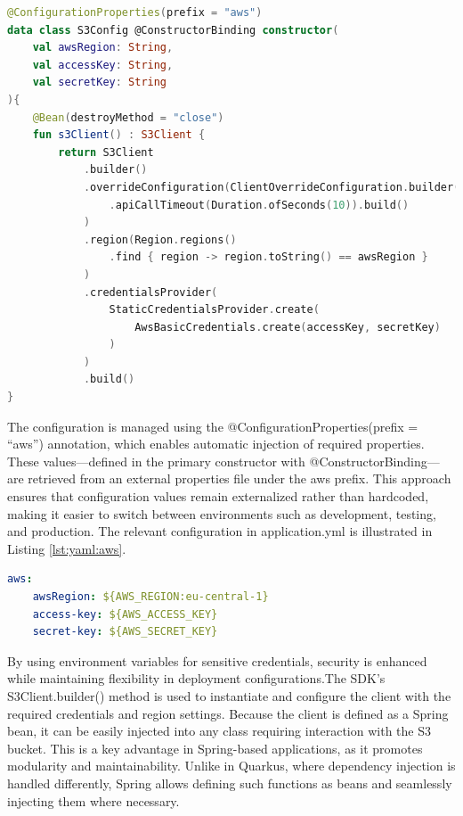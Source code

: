 \begin{lstlisting}[language=Kotlin,caption=Configuring the S3 Client,label=lst:kotlin:s3client]
@ConfigurationProperties(prefix = "aws")
data class S3Config @ConstructorBinding constructor(
    val awsRegion: String,
    val accessKey: String,
    val secretKey: String
){
    @Bean(destroyMethod = "close")
    fun s3Client() : S3Client {
        return S3Client
            .builder()
            .overrideConfiguration(ClientOverrideConfiguration.builder()
                .apiCallTimeout(Duration.ofSeconds(10)).build()
            )
            .region(Region.regions()
                .find { region -> region.toString() == awsRegion }
            )
            .credentialsProvider(
                StaticCredentialsProvider.create(
                    AwsBasicCredentials.create(accessKey, secretKey)
                )
            )
            .build()
}
\end{lstlisting}

The configuration is managed using the @ConfigurationProperties(prefix = ``aws'') annotation, which enables automatic injection of required properties. These values—defined in the primary constructor with @ConstructorBinding—are retrieved from an external properties file under the aws prefix. This approach ensures that configuration values remain externalized rather than hardcoded, making it easier to switch between environments such as development, testing, and production. The relevant configuration in application.yml is illustrated in Listing \ref{lst:yaml:aws}.
\begin{lstlisting}[language=Yaml, caption=AWS Configuration in application.yml, label=lst:yaml:aws]
aws:
    awsRegion: ${AWS_REGION:eu-central-1}
    access-key: ${AWS_ACCESS_KEY}
    secret-key: ${AWS_SECRET_KEY}
\end{lstlisting}

By using environment variables for sensitive credentials, security is enhanced while maintaining flexibility in deployment configurations.The SDK’s S3Client.builder() method is used to instantiate and configure the client with the required credentials and region settings. Because the client is defined as a Spring bean, it can be easily injected into any class requiring interaction with the S3 bucket. This is a key advantage in Spring-based applications, as it promotes modularity and maintainability. Unlike in Quarkus, where dependency injection is handled differently, Spring allows defining such functions as beans and seamlessly injecting them where necessary.

